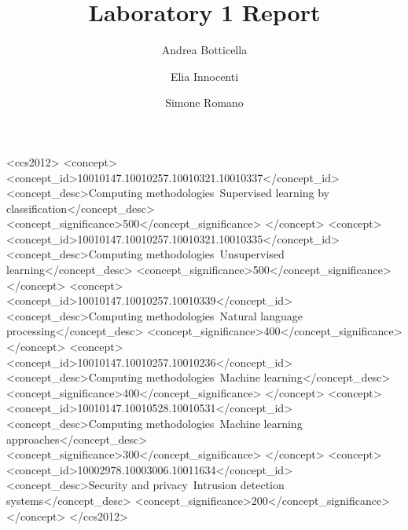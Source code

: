\documentclass[acmlarge]{template/column-format-template/acmart}
\begin{document}

\title{Laboratory 1 Report}

\author{Andrea Botticella}

\author{Elia Innocenti}
\authornotemark[1]

\author{Simone Romano}
\authornotemark[1]

\renewcommand{\shortauthors}{Botticella, Innocenti, and Romano}


\begin{CCSXML}
<ccs2012>
   <concept>
       <concept_id>10010147.10010257.10010321.10010337</concept_id>
       <concept_desc>Computing methodologies~Supervised learning by classification</concept_desc>
       <concept_significance>500</concept_significance>
   </concept>
   <concept>
       <concept_id>10010147.10010257.10010321.10010335</concept_id>
       <concept_desc>Computing methodologies~Unsupervised learning</concept_desc>
       <concept_significance>500</concept_significance>
   </concept>
   <concept>
       <concept_id>10010147.10010257.10010339</concept_id>
       <concept_desc>Computing methodologies~Natural language processing</concept_desc>
       <concept_significance>400</concept_significance>
   </concept>
   <concept>
       <concept_id>10010147.10010257.10010236</concept_id>
       <concept_desc>Computing methodologies~Machine learning</concept_desc>
       <concept_significance>400</concept_significance>
   </concept>
   <concept>
       <concept_id>10010147.10010528.10010531</concept_id>
       <concept_desc>Computing methodologies~Machine learning approaches</concept_desc>
       <concept_significance>300</concept_significance>
   </concept>
   <concept>
       <concept_id>10002978.10003006.10011634</concept_id>
       <concept_desc>Security and privacy~Intrusion detection systems</concept_desc>
       <concept_significance>200</concept_significance>
   </concept>
</ccs2012>
\end{CCSXML}
\end{document}
